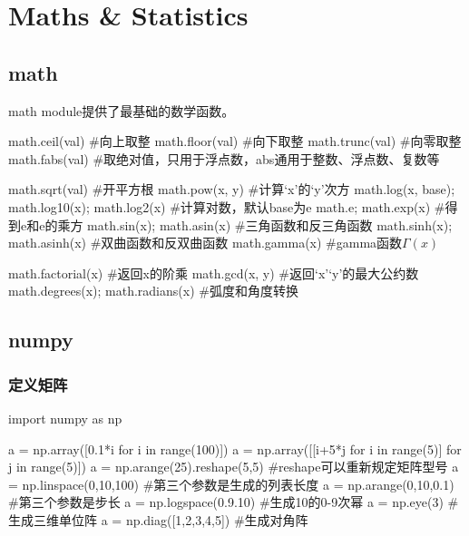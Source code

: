 \section{Maths \& Statistics}

  \subsection{math}
    math module提供了最基础的数学函数。
    \begin{codeblock}[language=python, caption={math module}]
      math.ceil(val) #向上取整
      math.floor(val) #向下取整
      math.trunc(val) #向零取整
      math.fabs(val) #取绝对值，只用于浮点数，abs通用于整数、浮点数、复数等

      math.sqrt(val) #开平方根
      math.pow(x, y) #计算`x'的`y'次方
      math.log(x, base); math.log10(x); math.log2(x) #计算对数，默认base为e
      math.e; math.exp(x) #得到e和e的乘方
      math.sin(x); math.asin(x) #三角函数和反三角函数
      math.sinh(x); math.asinh(x) #双曲函数和反双曲函数
      math.gamma(x) #gamma函数$\Gamma(x)$

      math.factorial(x) #返回x的阶乘
      math.gcd(x, y) #返回`x'`y'的最大公约数
      math.degrees(x); math.radians(x) #弧度和角度转换
    \end{codeblock}

  \subsection{numpy}
    \subsubsection{定义矩阵}
      \begin{codeblock}[language=python, caption={Define matrices using numpy}]
        import numpy as np

        a = np.array([0.1*i for i in range(100)])
        a = np.array([[i+5*j for i in range(5)] for j in range(5)])
        a = np.arange(25).reshape(5,5) #reshape可以重新规定矩阵型号
        a = np.linspace(0,10,100) #第三个参数是生成的列表长度
        a = np.arange(0,10,0.1) #第三个参数是步长
        a = np.logspace(0.9.10) #生成10的0-9次幂
        a = np.eye(3) #生成三维单位阵
        a = np.diag([1,2,3,4,5]) #生成对角阵
      \end{codeblock}

